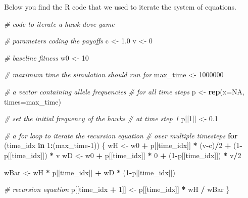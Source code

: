\documentclass[
]{book}
\newenvironment{Shaded}{\begin{snugshade}}{\end{snugshade}}
\newcommand{\AttributeTok}[1]{\textcolor[rgb]{0.13,0.29,0.53}{#1}}
\newcommand{\CommentTok}[1]{\textcolor[rgb]{0.56,0.35,0.01}{\textit{#1}}}
\newcommand{\ConstantTok}[1]{\textcolor[rgb]{0.56,0.35,0.01}{#1}}
\newcommand{\ControlFlowTok}[1]{\textcolor[rgb]{0.13,0.29,0.53}{\textbf{#1}}}
\newcommand{\DecValTok}[1]{\textcolor[rgb]{0.00,0.00,0.81}{#1}}
\newcommand{\FloatTok}[1]{\textcolor[rgb]{0.00,0.00,0.81}{#1}}
\newcommand{\FunctionTok}[1]{\textcolor[rgb]{0.13,0.29,0.53}{\textbf{#1}}}
\newcommand{\NormalTok}[1]{#1}
\newcommand{\OtherTok}[1]{\textcolor[rgb]{0.56,0.35,0.01}{#1}}
\newcommand{\SpecialCharTok}[1]{\textcolor[rgb]{0.81,0.36,0.00}{\textbf{#1}}}
\begin{document}
Below you find the R code that we used to iterate the system of equations.

\begin{Shaded}
\begin{Highlighting}[]
\CommentTok{\# code to iterate a hawk{-}dove game}


\CommentTok{\# parameters coding the payoffs}
\NormalTok{c }\OtherTok{\textless{}{-}} \FloatTok{1.0}
\NormalTok{v }\OtherTok{\textless{}{-}} \DecValTok{0}

\CommentTok{\# baseline fitness}
\NormalTok{w0 }\OtherTok{\textless{}{-}} \DecValTok{10}

\CommentTok{\# maximum time the simulation should run for}
\NormalTok{max\_time }\OtherTok{\textless{}{-}} \DecValTok{1000000}

\CommentTok{\# a vector containing allele frequencies}
\CommentTok{\# for all time steps}
\NormalTok{p }\OtherTok{\textless{}{-}} \FunctionTok{rep}\NormalTok{(}\AttributeTok{x=}\ConstantTok{NA}\NormalTok{, }\AttributeTok{times=}\NormalTok{max\_time)}

\CommentTok{\# set the initial frequency of the hawks}
\CommentTok{\# at time step 1}
\NormalTok{p[[}\DecValTok{1}\NormalTok{]] }\OtherTok{\textless{}{-}} \FloatTok{0.1}

\CommentTok{\# a for loop to iterate the recursion equation}
\CommentTok{\# over multiple timesteps}
\ControlFlowTok{for}\NormalTok{ (time\_idx }\ControlFlowTok{in} \DecValTok{1}\SpecialCharTok{:}\NormalTok{(max\_time}\SpecialCharTok{{-}}\DecValTok{1}\NormalTok{))}
\NormalTok{\{}
\NormalTok{  wH }\OtherTok{\textless{}{-}}\NormalTok{ w0 }\SpecialCharTok{+}\NormalTok{ p[[time\_idx]] }\SpecialCharTok{*}\NormalTok{ (v}\SpecialCharTok{{-}}\NormalTok{c)}\SpecialCharTok{/}\DecValTok{2} \SpecialCharTok{+}\NormalTok{ (}\DecValTok{1}\SpecialCharTok{{-}}\NormalTok{p[[time\_idx]]) }\SpecialCharTok{*}\NormalTok{ v}
\NormalTok{  wD }\OtherTok{\textless{}{-}}\NormalTok{ w0 }\SpecialCharTok{+}\NormalTok{ p[[time\_idx]] }\SpecialCharTok{*} \DecValTok{0} \SpecialCharTok{+}\NormalTok{ (}\DecValTok{1}\SpecialCharTok{{-}}\NormalTok{p[[time\_idx]]) }\SpecialCharTok{*}\NormalTok{ v}\SpecialCharTok{/}\DecValTok{2}

\NormalTok{  wBar }\OtherTok{\textless{}{-}}\NormalTok{ wH }\SpecialCharTok{*}\NormalTok{ p[[time\_idx]] }\SpecialCharTok{+}\NormalTok{ wD }\SpecialCharTok{*}\NormalTok{ (}\DecValTok{1}\SpecialCharTok{{-}}\NormalTok{p[[time\_idx]])}

  \CommentTok{\# recursion equation}
\NormalTok{  p[[time\_idx }\SpecialCharTok{+} \DecValTok{1}\NormalTok{]] }\OtherTok{\textless{}{-}}\NormalTok{ p[[time\_idx]] }\SpecialCharTok{*}\NormalTok{ wH }\SpecialCharTok{/}\NormalTok{ wBar}
\NormalTok{\}}
\end{Highlighting}
\end{Shaded}
\end{document}
